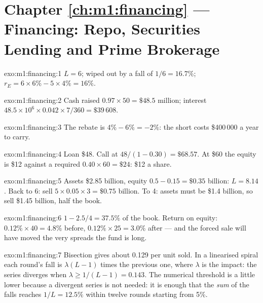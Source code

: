 \section*{Chapter \ref{ch:m1:financing} --- Financing: Repo, Securities Lending and Prime Brokerage}

\begin{solution}{exo:m1:financing:1}
$L = 6$; wiped out by a fall of $1/6 = 16.7\%$; $r_E = 6 \times 6\% - 5
\times 4\% = 16\%$.
\end{solution}

\begin{solution}{exo:m1:financing:2}
Cash raised $0.97 \times 50 = \$48.5$ million; interest $48.5\times10^6
\times 0.042 \times 7/360 = \$39\,608$.
\end{solution}

\begin{solution}{exo:m1:financing:3}
The rebate is $4\% - 6\% = -2\%$: the short costs \$400\,000 a year to carry.
\end{solution}

\begin{solution}{exo:m1:financing:4}
Loan \$48. Call at $48/(1-0.30) = \$68.57$. At \$60 the equity is \$12
against a required $0.40\times60 = \$24$: \$12 a share.
\end{solution}

\begin{solution}{exo:m1:financing:5}
Assets \$2.85 billion, equity $0.5 - 0.15 = \$0.35$ billion: $L = 8.14$.
Back to 6: sell $5 \times 0.05 \times 3 = \$0.75$ billion. To 4: assets must
be \$1.4 billion, so sell \$1.45 billion, half the book.
\end{solution}

\begin{solution}{exo:m1:financing:6}
$1 - 2.5/4 = 37.5\%$ of the book. Return on equity: $0.12\% \times 40 =
4.8\%$ before, $0.12\% \times 25 = 3.0\%$ after --- and the forced sale will
have moved the very spreads the fund is long.
\end{solution}

\begin{solution}{exo:m1:financing:7}
Bisection gives about 0.129 per unit sold. In a linearised spiral each
round's fall is $\lambda(L-1)$ times the previous one, where $\lambda$ is the
impact: the series diverges when $\lambda \ge 1/(L-1) = 0.143$. The numerical
threshold is a little lower because a divergent series is not needed: it is
enough that the \emph{sum} of the falls reaches $1/L = 12.5\%$ within twelve
rounds starting from 5\%.
\end{solution}

